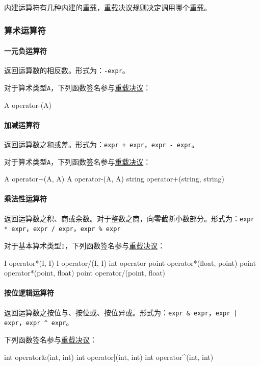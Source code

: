 \documentclass[UTF8]{ctexart}
\begin{document}
内建运算符有几种内建的重载，\hyperref[chongzai]{重载决议}规则决定调用哪个重载。

\subsubsection{算术运算符}
\label{suanshu}

\paragraph{一元负运算符} 返回运算数的相反数。形式为：\verb|-expr|。

对于算术类型\verb|A|，下列函数签名参与\hyperref[chongzai]{重载决议}：%
\begin{MUAvbt}
A operator-(A)
\end{MUAvbt}

\paragraph{加减运算符} 返回运算数之和或差。形式为：\verb|expr + expr|，\verb|expr - expr|。

对于算术类型\verb|A|，下列函数签名参与\hyperref[chongzai]{重载决议}：
\begin{MUAvbt}
A operator+(A, A)
A operator-(A, A)
string operator+(string, string)
\end{MUAvbt}

\paragraph{乘法性运算符} 返回运算数之积、商或余数。对于整数之商，向零截断小数部分。形式为：\verb|expr * expr|，\verb|expr / expr|，\verb|expr % expr|

对于基本算术类型\verb|I|，下列函数签名参与\hyperref[chongzai]{重载决议}：
\begin{MUAvbt}
I operator*(I, I)
I operator/(I, I)
int operator%
point operator*(float, point)
point operator*(point, float)
point operator/(point, float)
\end{MUAvbt}

\paragraph{按位逻辑运算符} 返回运算数之按位与、按位或、按位异或。形式为：\verb|expr & expr|，\verb&expr | expr&，\verb|expr ^ expr|。

下列函数签名参与\hyperref[chongzai]{重载决议}：
\begin{MUAvbt}
int operator&(int, int)
int operator|(int, int)
int operator^(int, int)
\end{MUAvbt}
\end{document}
